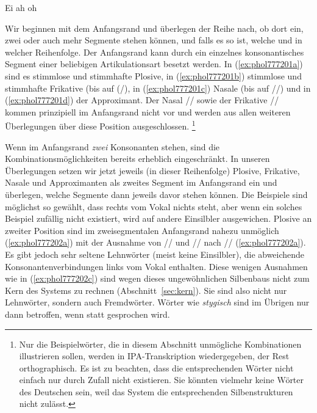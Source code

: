 \begin{exe}
	\ex\label{ex:phol777200}
	\begin{xlist}
		\ex Ei \textipa{[P\t{aE}]}	
		\ex ah \textipa{[Pa:]}	
		\ex oh \textipa{[Po:]}	
	\end{xlist}
\end{exe}

Wir beginnen mit dem Anfangsrand und überlegen der Reihe nach, ob dort ein, zwei oder auch mehr Segmente stehen können, und falls es so ist, welche und in welcher Reihenfolge.
Der Anfangsrand kann durch ein einzelnes konsonantisches Segment einer beliebigen Artikulationsart besetzt werden.
In (\ref{ex:phol777201a}) sind es stimmlose und stimmhafte Plosive, in (\ref{ex:phol777201b}) stimmlose und stimmhafte Frikative (bis auf (/), in (\ref{ex:phol777201c}) Nasale (bis auf //) und in (\ref{ex:phol777201d}) der Approximant.
Der Nasal // sowie der Frikative // kommen prinzipiell im Anfangsrand nicht vor und werden aus allen weiteren Überlegungen über diese Position ausgeschlossen.%
\footnote{Nur die Beispielwörter, die in diesem Abschnitt unmögliche Kombinationen illustrieren sollen, werden in IPA-Transkription wiedergegeben, der Rest orthographisch.
Es ist zu beachten, dass die entsprechenden Wörter nicht einfach nur durch Zufall nicht existieren.
Sie könnten vielmehr keine Wörter des Deutschen sein, weil das System die entsprechenden Silbenstrukturen nicht zulässt.}

\begin{exe}
	\ex\label{ex:phol777201}
	\begin{xlist}
		\ex{\label{ex:phol777201a} Kuh, geh}
		\ex{\label{ex:phol777201b} Schuh, hau, Reh, Vieh, wo, *\textipa{[\c{c}i:]}}
		\ex{\label{ex:phol777201c} nie, mäh, *\textipa{[Nu:]}}
		\ex{\label{ex:phol777201d} lau}
	\end{xlist}
\end{exe}

Wenn im Anfangsrand \textit{zwei} Konsonanten stehen, sind die Kombinationsmöglichkeiten bereits erheblich eingeschränkt.
In unseren Überlegungen setzen wir jetzt jeweils (in dieser Reihenfolge) Plosive, Frikative, Nasale und Approximanten als zweites Segment im Anfangsrand ein und überlegen, welche Segmente dann jeweils davor stehen können.
Die Beispiele sind möglichst so gewählt, dass rechts vom Vokal nichts steht, aber wenn ein solches Beispiel zufällig nicht existiert, wird auf andere Einsilbler ausgewichen.
Plosive an zweiter Position sind im zweisegmentalen Anfangsrand nahezu unmöglich (\ref{ex:phol777202a}) mit der Ausnahme von // und // nach // (\ref{ex:phol777202a}).
Es gibt jedoch sehr seltene Lehnwörter (meist keine Einsilbler), die abweichende Konsonantenverbindungen links vom Vokal enthalten.
Diese wenigen Ausnahmen wie in (\ref{ex:phol777202c}) sind wegen dieses ungewöhnlichen Silbenbaus nicht zum Kern des Systems zu rechnen (Abschnitt~\ref{sec:kern}).
Sie sind also nicht nur Lehnwörter, sondern auch Fremdwörter.
Wörter wie \textit{stygisch} sind im Übrigen nur dann betroffen, wenn \textipa{[st]} statt \textipa{[St]} gesprochen wird.

